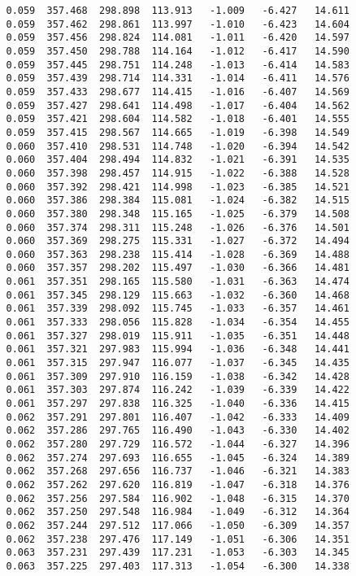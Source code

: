 \begin{verbatim}
   0.059  357.468  298.898  113.913   -1.009   -6.427   14.611
   0.059  357.462  298.861  113.997   -1.010   -6.423   14.604
   0.059  357.456  298.824  114.081   -1.011   -6.420   14.597
   0.059  357.450  298.788  114.164   -1.012   -6.417   14.590
   0.059  357.445  298.751  114.248   -1.013   -6.414   14.583
   0.059  357.439  298.714  114.331   -1.014   -6.411   14.576
   0.059  357.433  298.677  114.415   -1.016   -6.407   14.569
   0.059  357.427  298.641  114.498   -1.017   -6.404   14.562
   0.059  357.421  298.604  114.582   -1.018   -6.401   14.555
   0.059  357.415  298.567  114.665   -1.019   -6.398   14.549
   0.060  357.410  298.531  114.748   -1.020   -6.394   14.542
   0.060  357.404  298.494  114.832   -1.021   -6.391   14.535
   0.060  357.398  298.457  114.915   -1.022   -6.388   14.528
   0.060  357.392  298.421  114.998   -1.023   -6.385   14.521
   0.060  357.386  298.384  115.081   -1.024   -6.382   14.515
   0.060  357.380  298.348  115.165   -1.025   -6.379   14.508
   0.060  357.374  298.311  115.248   -1.026   -6.376   14.501
   0.060  357.369  298.275  115.331   -1.027   -6.372   14.494
   0.060  357.363  298.238  115.414   -1.028   -6.369   14.488
   0.060  357.357  298.202  115.497   -1.030   -6.366   14.481
   0.061  357.351  298.165  115.580   -1.031   -6.363   14.474
   0.061  357.345  298.129  115.663   -1.032   -6.360   14.468
   0.061  357.339  298.092  115.745   -1.033   -6.357   14.461
   0.061  357.333  298.056  115.828   -1.034   -6.354   14.455
   0.061  357.327  298.019  115.911   -1.035   -6.351   14.448
   0.061  357.321  297.983  115.994   -1.036   -6.348   14.441
   0.061  357.315  297.947  116.077   -1.037   -6.345   14.435
   0.061  357.309  297.910  116.159   -1.038   -6.342   14.428
   0.061  357.303  297.874  116.242   -1.039   -6.339   14.422
   0.061  357.297  297.838  116.325   -1.040   -6.336   14.415
   0.062  357.291  297.801  116.407   -1.042   -6.333   14.409
   0.062  357.286  297.765  116.490   -1.043   -6.330   14.402
   0.062  357.280  297.729  116.572   -1.044   -6.327   14.396
   0.062  357.274  297.693  116.655   -1.045   -6.324   14.389
   0.062  357.268  297.656  116.737   -1.046   -6.321   14.383
   0.062  357.262  297.620  116.819   -1.047   -6.318   14.376
   0.062  357.256  297.584  116.902   -1.048   -6.315   14.370
   0.062  357.250  297.548  116.984   -1.049   -6.312   14.364
   0.062  357.244  297.512  117.066   -1.050   -6.309   14.357
   0.062  357.238  297.476  117.149   -1.051   -6.306   14.351
   0.063  357.231  297.439  117.231   -1.053   -6.303   14.345
   0.063  357.225  297.403  117.313   -1.054   -6.300   14.338

\end{verbatim}
